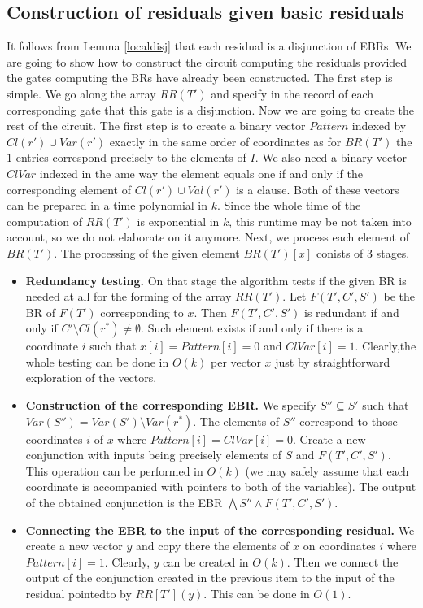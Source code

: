 \documentclass{llncs}
\begin{document}
\subsection{Construction of residuals given basic residuals}
It follows from Lemma \ref{localdisj} that each residual is a disjunction of EBRs. We are going to show how to construct
the circuit computing the residuals provided the gates computing the BRs have already been constructed. 
The first step is simple. We go along the array $RR(T')$ and 
specify in the record of each corresponding gate that this gate is a disjunction. Now we are going to create
the rest of the circuit. The first step is to create a binary vector $Pattern$ indexed by $Cl(r') \cup Var(r')$ exactly in the
same order of coordinates as for $BR(T')$ the $1$ entries correspond precisely to the elements of $I$. We also need a 
binary vector $ClVar$ indexed in the ame way the element equals one if and only if the corresponding element of
$Cl(r') \cup Val(r')$ is a clause. Both of these vectors can be prepared in a time polynomial in $k$.
Since the whole time of the computation of $RR(T')$ is exponential in $k$, this runtime may be not taken into
account, so we do not elaborate on it anymore.  Next, we process each element of $BR(T')$. The processing of the given
element $BR(T')[x]$ conists of $3$ stages.
\begin{itemize}
\item {\bf Redundancy testing.} On that stage the algorithm tests if the given BR is needed at all for the forming
of the array $RR(T')$. Let $F(T',C',S')$ be the BR of $F(T')$ corresponding to $x$. Then $F(T',C',S')$ is redundant
if and only if $C' \setminus Cl(r^*) \neq \emptyset$. Such element exists if and only if there is a coordinate
$i$ such that $x[i]=Pattern[i]=0$ and $ClVar[i]=1$. Clearly,the whole testing can be done in $O(k)$ per vector $x$
just by straightforward exploration of the vectors.   
\item {\bf Construction of the corresponding EBR.}
We specify $S'' \subseteq S'$ such that $Var(S'')=Var(S') \setminus Var(r^*)$. The elements of $S''$ correspond
to those coordinates $i$ of $x$ where $Pattern[i]=ClVar[i]=0$. Create a new conjunction with inputs being precisely
elements of $S$ and $F(T',C',S')$. This operation can be performed in $O(k)$ (we may safely assume that each coordinate
is accompanied with pointers to both of the variables). The output of the obtained conjunction is the EBR
$\bigwedge S'' \wedge F(T',C',S')$. 
\item {\bf Connecting the EBR to the input of the corresponding residual.}
We create a new vector $y$ and copy there the elements of $x$ on coordinates $i$ where $Pattern[i]=1$.
Clearly, $y$ can be created in $O(k)$. Then we connect the output of the conjunction created in the previous
item to the input of the residual pointedto by $RR[T'](y)$. This can be done in $O(1)$.     
\end{itemize}    
\end{document}
